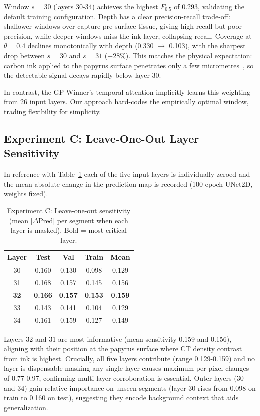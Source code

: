 Window $s = 30$ (layers 30-34) achieves the highest $F_{0.5}$ of 0.293, validating the default training configuration. Depth has a clear precision-recall trade-off: shallower windows over-capture pre-surface tissue, giving high recall but poor precision, while deeper windows miss the ink layer, collapsing recall. Coverage at $\theta = 0.4$ declines monotonically with depth (0.330 $\to$ 0.103), with the sharpest drop between $s = 30$ and $s = 31$ ($-28\%$). This matches the physical expectation: carbon ink applied to the papyrus surface penetrates only a few micrometres~\cite{mocella2015revealing}, so the detectable signal decays rapidly below layer 30.

In contrast, the GP Winner's temporal attention implicitly learns this weighting from 26 input layers. Our approach hard-codes the empirically optimal window, trading flexibility for simplicity.

\subsection{Experiment C: Leave-One-Out Layer Sensitivity}

In reference with Table~\ref{tab:exp_c} each of the five input layers is individually zeroed and the mean absolute change in the prediction map is recorded (100-epoch UNet2D, weights fixed).

\begin{table}[h]
\centering
\caption{Experiment C: Leave-one-out sensitivity (mean $|\Delta\text{Pred}|$ per segment when each layer is masked). Bold = most critical layer.}
\label{tab:exp_c}
\begin{tabular}{ccccc}
\hline
\textbf{Layer} & \textbf{Test} & \textbf{Val} & \textbf{Train} & \textbf{Mean} \\
\hline
30 & 0.160 & 0.130 & 0.098 & 0.129 \\
31 & 0.168 & 0.157 & 0.145 & 0.156 \\
\textbf{32} & \textbf{0.166} & \textbf{0.157} & \textbf{0.153} & \textbf{0.159} \\
33 & 0.143 & 0.141 & 0.104 & 0.129 \\
34 & 0.161 & 0.159 & 0.127 & 0.149 \\
\hline
\end{tabular}
\end{table}

Layers 32 and 31 are most informative (mean sensitivity 0.159 and 0.156), aligning with their position at the papyrus surface where CT density contrast from ink is highest. Crucially, all five layers contribute (range 0.129-0.159) and no layer is dispensable 
masking any single layer causes maximum per-pixel changes of 0.77-0.97, confirming multi-layer corroboration is essential. Outer layers (30 and 34) gain relative importance on unseen segments (layer 30 rises from 0.098 on train to 0.160 on test), suggesting they encode background context that aids generalization.

